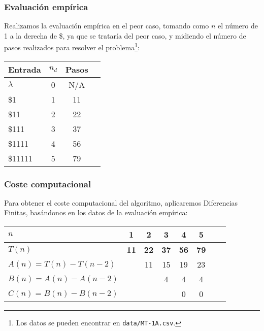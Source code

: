 \subsubsection*{Evaluación empírica}
Realizamos la evaluación empírica en el peor caso, tomando como $n$ el número de 1 a la derecha de \$, ya que se trataría del peor caso, y midiendo el número de pasos realizados para resolver el problema\footnote{Los datos se pueden encontrar en \texttt{data/MT-1A.csv}.}:

\begin{table}[h]
    \centering
    \begin{tabular}{lccc}
        Entrada & $n_d$ & Pasos \\
        \hline
        $\lambda$               & 0  & N/A \\
        \$1                     & 1  & 11  \\
        \$11                    & 2  & 22  \\
        \$111                   & 3  & 37  \\
        \$1111                  & 4  & 56  \\
        \$11111                 & 5  & 79  \\
    \end{tabular}
\end{table}


\subsubsection*{Coste computacional}
Para obtener el coste computacional del algoritmo, aplicaremos Diferencias Finitas, basándonos en los datos de la evaluación empírica:

\begin{table}[h]
    \centering
    \begin{tabular}{|l|c|c|c|c|c|c|c|}
        \hline
        $n$ & \textbf{1} & \textbf{2} & \textbf{3} & \textbf{4} & \textbf{5}\\ \hline
        $T(n)$ & \textbf{11} & \textbf{22} & \textbf{37} & \textbf{56} & \textbf{79}      \\ \hline
        \hline
        $A(n) = T(n) - T(n-2)$ &    & 11 & 15 & 19 & 23\\ \hline
        $B(n) = A(n) - A(n-2)$ &    &    &  4 &  4 &  4\\ \hline
        $C(n) = B(n) - B(n-2)$ &    &    &    &  0 &  0 \\ \hline
    \end{tabular}
\end{table}

